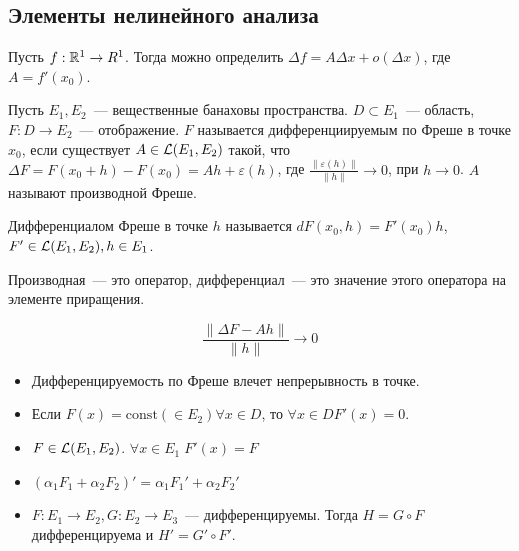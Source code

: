\subsection{Элементы нелинейного анализа} %

Пусть $f: \mathbb{R}^1 \to R^1$. Тогда можно определить $\Delta f = A \Delta x + o(\Delta x)$, где $A = f'(x_0)$.

\begin{definition}
    Пусть $E_1, E_2$~--- вещественные банаховы пространства. $D \subset E_1$~--- область, $F: D \to E_2$~--- отображение. $F$ называется дифференциируемым по Фреше в точке $x_0$, 
    если существует $A \in \mathcal{L}(E_1, E_2)$ такой, что $\Delta F = F(x_0 + h) - F(x_0) = A h + \varepsilon(h)$, где $\frac{\|\varepsilon(h) \|}{\|h\|} \to 0$, при $h \to 0$. $A$ называют производной Фреше.
\end{definition}

\begin{definition}
    Дифференциалом Фреше в точке $h$ называется 
    $dF(x_0, h) = F'(x_0) h$, $F' \in \mathcal{L}(E_1, E_2), h \in E_1$.
\end{definition}

\begin{lemmanote}
    Производная~--- это оператор, дифференциал~--- это значение этого оператора на элементе приращения.
\end{lemmanote}

\begin{definition}
    \[
    \frac{\|\Delta F - Ah\|}{\|h\|} \to 0
    \]
\end{definition}

\begin{statement}
    \begin{itemize}
        \item[0.]  Дифференцируемость по Фреше влечет непрерывность в точке.
        \item[1.] Если $F(x) = \text{const} (\in E_2) \forall x \in D$, то $\forall x \in D F'(x) = 0$.
        \item[2.] $F \in \mathcal{L}(E_1,E_2)$. $\forall x \in E_1 \; F'(x)=F$
        \item[3.] $(\alpha_1 F_1 + \alpha_2 F_2)'=\alpha_1 F_1' + \alpha_2 F_2'$
        \item[4.] $F: E_1 \to E_2, G: E_2 \to E_3$~--- дифференцируемы. 
        Тогда $H = G \circ F$ дифференцируема и $H' = G' \circ F'$. %
    \end{itemize}
\end{statement}

